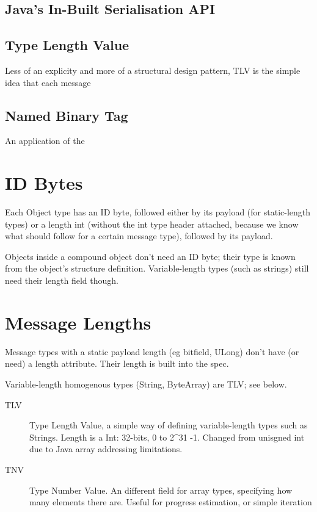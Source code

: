 \documentclass[12pt,a4paper,]{adreport}
\begin{document}
\subsection{Java's In-Built Serialisation
API}\label{javas-in-built-serialisation-api}

\subsection{Type Length Value}\label{type-length-value}

Less of an explicity and more of a structural design pattern, TLV is the
simple idea that each message

\subsection{Named Binary Tag}\label{named-binary-tag}

An application of the

\section{ID Bytes}\label{id-bytes}

Each Object type has an ID byte, followed either by its payload (for
static-length types) or a length int (without the int type header
attached, because we know what should follow for a certain message
type), followed by its payload.

Objects inside a compound object don't need an ID byte; their type is
known from the object's structure definition. Variable-length types
(such as strings) still need their length field though.

\section{Message Lengths}\label{message-lengths}

Message types with a static payload length (eg bitfield, ULong) don't
have (or need) a length attribute. Their length is built into the spec.

Variable-length homogenous types (String, ByteArray) are TLV; see below.

\begin{description}
\item[TLV]
Type Length Value, a simple way of defining variable-length types such
as Strings. Length is a Int: 32-bits, 0 to 2\^{}31 -1. Changed from
unisgned int due to Java array addressing limitations.
\item[TNV]
Type Number Value. An different field for array types, specifying how
many elements there are. Useful for progress estimation, or simple
iteration
\end{description}
\end{document}
